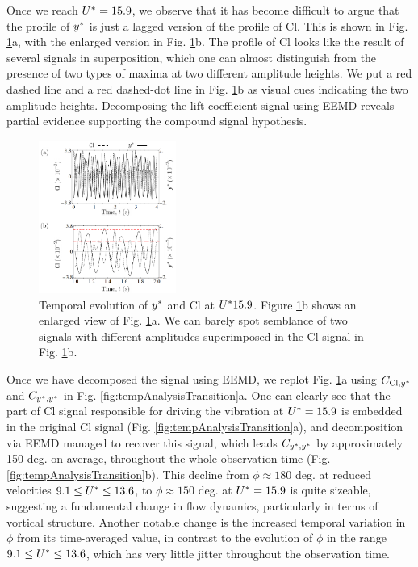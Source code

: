 \documentclass[a4paper,fleqn]{cas-sc}
\begin{document}
Once we reach $U^{*} = 15.9$, we observe that it has become difficult to argue that the profile of $y^{*}$ is just a lagged version of the profile of Cl. This is shown in Fig. \ref{fig:tempEvoCompare}a, with the enlarged version in Fig. \ref{fig:tempEvoCompare}b. The profile of Cl looks like the result of several signals in superposition, which one can almost distinguish from the presence of two types of maxima at two different amplitude heights. We put a red dashed line and a red dashed-dot line in Fig. \ref{fig:tempEvoCompare}b as visual cues indicating the two amplitude heights. Decomposing the lift coefficient signal using EEMD reveals partial evidence supporting the compound signal hypothesis.

\begin{figure}
  \centering
  \includegraphics[width=0.4\textwidth]{figs/figure15}
  \caption{Temporal evolution of $y^{*}$ and Cl at $U^{*} 15.9$. Figure \ref{fig:tempEvoCompare}b shows an enlarged view of Fig. \ref{fig:tempEvoCompare}a. We can barely spot semblance of two signals with different amplitudes superimposed in the Cl signal in Fig. \ref{fig:tempEvoCompare}b.} \label{fig:tempEvoCompare}
\end{figure}

Once we have decomposed the signal using EEMD, we replot Fig. \ref{fig:tempEvoCompare}a using $C_{\text{Cl},y^{*}}$ and $C_{y^{*},y^{*}}$ in Fig. \ref{fig:tempAnalysisTransition}a. One can clearly see that the part of Cl signal responsible for driving the vibration at  $U^{*} = 15.9$ is embedded in the original Cl signal (Fig. \ref{fig:tempAnalysisTransition}a), and decomposition via EEMD managed to recover this signal, which leads $C_{y^{*},y^{*}}$ by approximately 150 deg. on average, throughout the whole observation time (Fig. \ref{fig:tempAnalysisTransition}b). This decline from $\phi \approx 180$ deg. at reduced velocities $9.1 \leq U^{*} \leq 13.6$, to $\phi \approx 150$ deg. at $U^{*} = 15.9$ is quite sizeable, suggesting a fundamental change in flow dynamics, particularly in terms of vortical structure. Another notable change is the increased temporal variation in $\phi$ from its time-averaged value, in contrast to the evolution of $\phi$ in the range $9.1 \leq U^{*} \leq 13.6$, which has very little jitter throughout the observation time.
\end{document}
